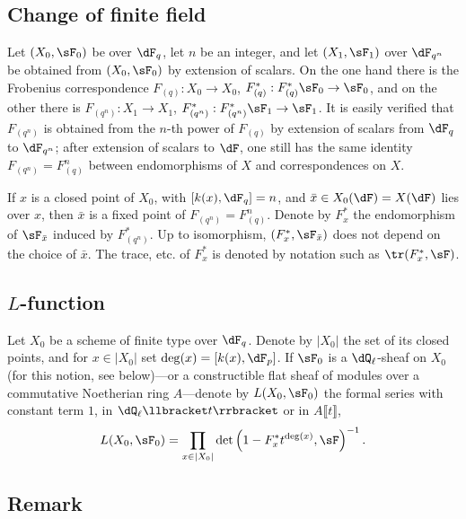 \subsection{Change of finite field}\label{II:1-5}

Let $(X_0,\sF_0)$ be over $\dF_q$, let $n$ be an integer, and let
$(X_1,\sF_1)$ over $\dF_{q^n}$ be obtained from $(X_0,\sF_0)$ by extension of
scalars. On the one hand there is the Frobenius correspondence
$F_{(q)}:X_0\to X_0$, $F_{(q)}^*:F_{(q)}^*\sF_0\to \sF_0$, and on the other
there is $F_{(q^n)}:X_1\to X_1$,
$F_{(q^n)}^*:F_{(q^n)}^*\sF_1\to\sF_1$. It is easily verified that
$F_{(q^n)}$ is obtained from the $n$-th power of $F_{(q)}$ by extension of
scalars from $\dF_q$ to $\dF_{q^n}$; after extension of scalars to $\dF$, one
still has the same identity $F_{(q^n)}=F_{(q)}^n$ between endomorphisms of
$X$ and correspondences on $X$.

If $x$ is a closed point of $X_0$, with $[k(x),\dF_q]=n$, and
$\bar x\in X_0(\dF) = X(\dF)$ lies over $x$, then $\bar x$ is a fixed point
of $F_{(q^n)}=F_{(q)}^n$. Denote by $F_x^*$ the endomorphism of
$\sF_{\bar x}$ induced by $F_{(q^n)}^*$. Up to isomorphism,
$(F_x^*,\sF_{\bar x})$ does not depend on the choice of $\bar x$.
The trace, etc. of $F_x^*$ is denoted by notation such as
$\tr(F_x^*,\sF)$.






\subsection{\texorpdfstring{$L$}{L}-function}\label{II:1-6}

Let $X_0$ be a scheme of finite type over $\dF_q$. Denote by $|X_0|$ the set
of its closed points, and for $x\in |X_0|$ set
$\deg(x)=[k(x),\dF_p]$. If $\sF_0$ is a $\dQ_\ell$-sheaf on $X_0$ (for this
notion, see below)---or a constructible flat sheaf of modules over a
commutative Noetherian ring $A$---denote by $L(X_0,\sF_0)$ the formal series
with constant term $1$, in $\dQ_\ell\llbracket t\rrbracket$ or in
$A\llbracket t\rrbracket$,
\[
  L(X_0,\sF_0) = \prod_{x\in|X_0|} \det\left(1-F_x^* t^{\deg(x)},\sF\right)^{-1} \text{.}
\]






\subsection{Remark}\label{II:1-7}

